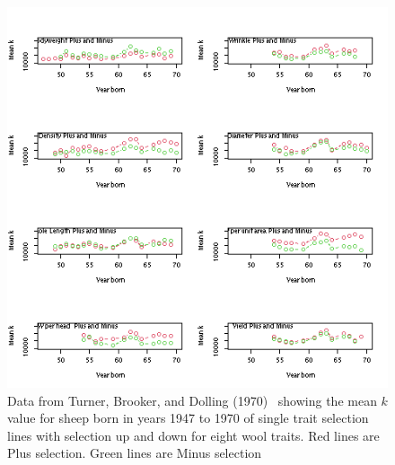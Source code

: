%

\begin{figure}[h]
  \centering
   \includegraphics[width=1.4\textwidth,height=1.7\textwidth]{ab1fs/fsk.png}
	\caption{Data from Turner, Brooker, and Dolling (1970)~\cite{turn:70} showing the mean $k$ value for sheep born in years 1947 to 1970  of single trait selection lines with selection up and down for eight wool traits. Red lines are Plus selection. Green lines are Minus selection}
  \label{fig:fsk}
\end{figure}

%

